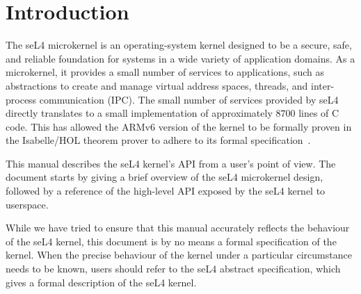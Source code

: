 %
%
%
%

\chapter{\label{ch:intro}Introduction}


The seL4 microkernel is an operating-system kernel designed to be
a secure, safe, and reliable foundation for systems in a wide variety of
application domains. As a microkernel, it provides a small number of
services to applications, such as abstractions to create and manage virtual address
spaces, threads, and inter-process communication (IPC). The small number
of services provided by seL4 directly translates to a small
implementation of approximately $8700$ lines of C code. This has allowed
the ARMv6 version of the kernel to be formally proven in the Isabelle/HOL 
theorem prover to adhere to its formal specification~\cite{Boyton_09,Cock_KS_08,Derrin_EKCC_06,Elkaduwe_GE_08,Klein_EHACDEEKNSTW_09,Tuch_KN_07,Winwood_KSACN_09}.

This manual describes the seL4 kernel's API from a user's point of view.
The document starts by giving a brief overview of the seL4 microkernel
design, followed by a reference of the high-level API exposed by the
seL4 kernel to userspace.

While we have tried to ensure that this manual accurately reflects the
behaviour of the seL4 kernel, this document is by no means a formal
specification of the kernel. When the precise behaviour of the kernel
under a particular circumstance needs to be known, users should refer to
the seL4 abstract specification, which
gives a formal description of the seL4 kernel.
